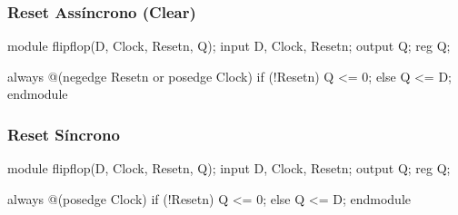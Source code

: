\begin{frame}[fragile]
	\frametitle{Reset Assíncrono (Clear)}
	\begin{verilogcode}
module flipflop(D, Clock, Resetn, Q); 
  input D, Clock, Resetn;
  output Q;
  reg Q;

  always @(negedge Resetn or posedge Clock) 
    if (!Resetn)
      Q <= 0; 
    else
      Q <= D; 
endmodule
	\end{verilogcode}
\end{frame}

\begin{frame}[fragile]
	\frametitle{Reset Síncrono}
	\begin{verilogcode}
module flipflop(D, Clock, Resetn, Q); 
  input D, Clock, Resetn;
  output Q;
  reg Q;

  always @(posedge Clock) 
    if (!Resetn)
      Q <= 0; 
    else
      Q <= D; 
endmodule
	\end{verilogcode}
\end{frame}


